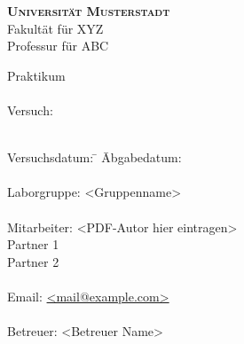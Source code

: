 \documentclass[
paper=a4,			%
german,				%
parskip=half,		%
twoside=false,		%
fontsize=12pt,		%
]{scrartcl}
\begin{document}
	
\begin{titlepage}				%
	\begin{center}
		\begin{LARGE}
			{\textsc{\textbf{Universität Musterstadt}}}\\
			Fakultät für XYZ\\
			Professur für ABC\\
		\end{LARGE}
		\hrulefill
		
		\vspace{1cm}
		{\LARGE Praktikum}\\
		{\huge \textbf{\Modulname{}}}\\
		\vspace{1cm}
		{\LARGE Versuch:}\\
		{\huge \textbf{\Versuchsname{}}}\\
	
		\vspace{1cm}
	\end{center}

	\begin{large}
		\begin{tabbing}
			Versuchsdatum: 	\quad\= \Versuchsdatum{} \quad\quad\= Abgabedatum: \quad \Abgabedatum{}\\\\
			
			Laborgruppe: 	\> <Gruppenname>\\\\
			
			Mitarbeiter:	\> <PDF-Autor hier eintragen>\\
							\> Partner 1\\
							\> Partner 2\\\\
			Email:			\> \href{mailto:mail@example.com}{<mail@example.com>}\\\\
			
			Betreuer:		\> <Betreuer Name> \\
		\end{tabbing}
	\end{large}
	
	\hrulefill
\end{titlepage}	





\end{document}
